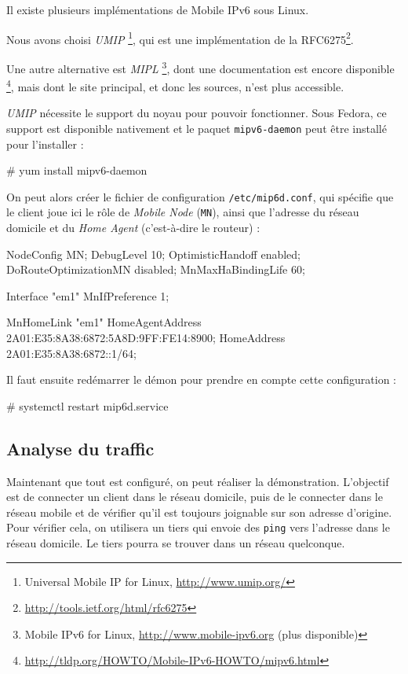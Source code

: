 Il existe plusieurs implémentations de Mobile IPv6 sous Linux.

Nous avons choisi \emph{UMIP} \footnote{Universal Mobile IP for Linux, \url{http://www.umip.org/}}, qui est une implémentation de la RFC6275\footnote{\url{http://tools.ietf.org/html/rfc6275}}.

Une autre alternative est \emph{MIPL} \footnote{Mobile IPv6 for Linux, \url{http://www.mobile-ipv6.org} (plus disponible)}, dont une documentation est encore disponible \footnote{\url{http://tldp.org/HOWTO/Mobile-IPv6-HOWTO/mipv6.html}}, mais dont le site principal, et donc les sources, n'est plus accessible.

\emph{UMIP} nécessite le support du noyau pour pouvoir fonctionner. Sous Fedora, ce support est disponible nativement et le paquet \texttt{mipv6-daemon} peut être installé pour l'installer :

\begin{code}
# yum install mipv6-daemon
\end{code}

On peut alors créer le fichier de configuration \texttt{/etc/mip6d.conf}, qui spécifie que le client joue ici le rôle de \emph{Mobile Node} (\texttt{MN}), ainsi que l'adresse du réseau domicile et du \emph{Home Agent} (c'est-à-dire le routeur) :

\begin{code}
NodeConfig MN;
DebugLevel 10;
OptimisticHandoff enabled;
DoRouteOptimizationMN disabled;
MnMaxHaBindingLife 60;

Interface "em1" {
  MnIfPreference 1;
}

MnHomeLink "em1" {
  HomeAgentAddress 2A01:E35:8A38:6872:5A8D:9FF:FE14:8900;
  HomeAddress 2A01:E35:8A38:6872::1/64;
}
\end{code}

Il faut ensuite redémarrer le démon pour prendre en compte cette configuration :

\begin{code}
# systemctl restart mip6d.service
\end{code}

\subsection{Analyse du traffic}

Maintenant que tout est configuré, on peut réaliser la démonstration.
L'objectif est de connecter un client dans le réseau domicile, puis de le connecter dans le réseau mobile et de vérifier qu'il est toujours joignable sur son adresse d'origine.
Pour vérifier cela, on utilisera un tiers qui envoie des \texttt{ping} vers l'adresse dans le réseau domicile.
Le tiers pourra se trouver dans un réseau quelconque.

